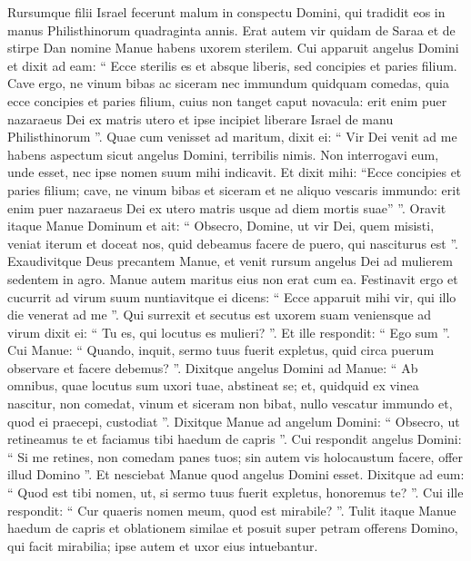\begin{biblechapter}
\begin{biblechapter}
\begin{biblechapter}
\begin{biblechapter}
\begin{biblechapter}
\begin{biblechapter}
\begin{biblechapter}
\begin{biblechapter}
\begin{biblechapter}
\begin{biblechapter}
\begin{biblechapter}
\begin{biblechapter}
\begin{biblechapter}
\verse Rursumque filii Israel fecerunt malum in conspectu Domini, qui tradidit eos in manus Philisthinorum quadraginta annis.
 \verse Erat autem vir quidam de Saraa et de stirpe Dan nomine Manue habens uxorem sterilem. 
\verse Cui apparuit angelus Domini et dixit ad eam: “ Ecce sterilis es et absque liberis, sed concipies et paries filium. 
\verse Cave ergo, ne vinum bibas ac siceram nec immundum quidquam comedas, 
\verse quia ecce concipies et paries filium, cuius non tanget caput novacula: erit enim puer nazaraeus Dei ex matris utero et ipse incipiet liberare Israel de manu Philisthinorum ”.
 \verse Quae cum venisset ad maritum, dixit ei: “ Vir Dei venit ad me habens aspectum sicut angelus Domini, terribilis nimis. Non interrogavi eum, unde esset, nec ipse nomen suum mihi indicavit. 
\verse Et dixit mihi: “Ecce concipies et paries filium; cave, ne vinum bibas et siceram et ne aliquo vescaris immundo: erit enim puer nazaraeus Dei ex utero matris usque ad diem mortis suae” ”.
 \verse Oravit itaque Manue Dominum et ait: “ Obsecro, Domine, ut vir Dei, quem misisti, veniat iterum et doceat nos, quid debeamus facere de puero, qui nasciturus est ”. 
\verse Exaudivitque Deus precantem Manue, et venit rursum angelus Dei ad mulierem sedentem in agro. Manue autem maritus eius non erat cum ea. 
\verse Festinavit ergo et cucurrit ad virum suum nuntiavitque ei dicens: “ Ecce apparuit mihi vir, qui illo die venerat ad me ”. 
\verse Qui surrexit et secutus est uxorem suam veniensque ad virum dixit ei: “ Tu es, qui locutus es mulieri? ”. Et ille respondit: “ Ego sum ”. 
\verse Cui Manue: “ Quando, inquit, sermo tuus fuerit expletus, quid circa puerum observare et facere debemus? ”. 
 \verse Dixitque angelus Domini ad Manue: “ Ab omnibus, quae locutus sum uxori tuae, abstineat se; 
\verse et, quidquid ex vinea nascitur, non comedat, vinum et siceram non bibat, nullo vescatur immundo et, quod ei praecepi, custodiat ”.
 \verse Dixitque Manue ad angelum Domini: “ Obsecro, ut retineamus te et faciamus tibi haedum de capris ”. 
\verse Cui respondit angelus Domini: “ Si me retines, non comedam panes tuos; sin autem vis holocaustum facere, offer illud Domino ”. Et nesciebat Manue quod angelus Domini esset. 
\verse Dixitque ad eum: “ Quod est tibi nomen, ut, si sermo tuus fuerit expletus, honoremus te? ”. 
\verse Cui ille respondit: “ Cur quaeris nomen meum, quod est mirabile? ”. 
\verse Tulit itaque Manue haedum de capris et oblationem similae et posuit super petram offerens Domino, qui facit mirabilia; ipse autem et uxor eius intuebantur. 

\end{biblechapter}
\end{biblechapter}
\end{biblechapter}
\end{biblechapter}
\end{biblechapter}
\end{biblechapter}
\end{biblechapter}
\end{biblechapter}
\end{biblechapter}
\end{biblechapter}
\end{biblechapter}
\end{biblechapter}
\end{biblechapter}
